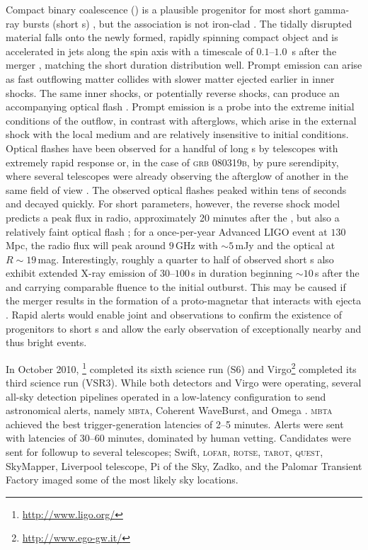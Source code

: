 Compact binary coalescence (\CBC{}) is a plausible progenitor for most short
gamma-ray bursts (short \GRB{}s) \citep{Lee:2005, nakar07}, but the
association is not iron-clad \citep{2011ApJ...727..109V}. The tidally
disrupted material falls onto the newly formed, rapidly spinning compact object
and is accelerated in jets along the spin axis with a timescale of
$0.1$--$1.0$~s after the merger \citep{Janka1999}, matching the short \GRB{}
duration distribution well. Prompt \EM{} emission can arise as fast outflowing
matter collides with slower matter ejected earlier in inner shocks. The same
inner shocks, or potentially reverse shocks, can produce an accompanying
optical flash \citep{Sari99}. Prompt emission is a probe into the extreme
initial conditions of the outflow, in contrast with afterglows, which arise in
the external shock with the local medium and are relatively insensitive to
initial conditions. Optical flashes have been observed for a handful of long
\GRB{}s \citep{2011CRPhy..12..255A} by telescopes with extremely rapid response
or, in the case of \textsc{grb 080319b}, by pure serendipity, where several
telescopes were already observing the afterglow of another \GRB{} in the same
field of view \citep{2008Natur.455..183R}. The observed optical flashes peaked
within tens of seconds and decayed quickly. For short \GRB{} parameters,
however, the reverse shock model predicts a peak flux in radio, approximately
20 minutes after the \GRB{}, but also a relatively faint optical flash
\citep{nakar07}; for a once-per-year Advanced LIGO event at $130$\,Mpc, the
radio flux will peak around $9$\,GHz with $\sim$$5$\,mJy and the optical at
$R\sim19$\,mag. Interestingly, roughly a quarter to half of observed short
\GRB{}s also exhibit extended X-ray emission of $30$--$100$\,s in duration
beginning $\sim$$10$\,s after the \GRB{} and carrying comparable fluence to the
initial outburst. This may be caused if the merger results in the formation of
a proto-magnetar that interacts with ejecta \citep{Bucciantini2011}. Rapid
\GW{} alerts would enable joint \EM{} and \GW{} observations to confirm the
existence of \CBC{} progenitors to short \GRB{}s and allow the early \EM{}
observation of exceptionally nearby and thus bright events.

In October 2010, \LIGO{}\footnote{\url{http://www.ligo.org/}} completed its
sixth science run (S6) and Virgo\footnote{\url{http://www.ego-gw.it/}}
completed its third science run (VSR3).  While both \LIGO{} detectors and Virgo
were operating, several all-sky detection pipelines operated in a low-latency
configuration to send astronomical alerts, namely \textsc{mbta}, Coherent
WaveBurst, and Omega \citep{HugheyGWPAW2011, S6lowlatency2, S6lowlatency3, S6lowlatency4}.
\textsc{mbta} achieved the best \GW{} trigger-generation latencies of 2--5 minutes.
Alerts were sent with latencies of 30--60 minutes, dominated by human vetting.
Candidates were sent for \EM{} followup to several telescopes; Swift,
\textsc{lofar}, \textsc{rotse}, \textsc{tarot}, \textsc{quest}, SkyMapper,
Liverpool telescope, Pi of the Sky, Zadko, and the Palomar Transient Factory
\citep{kanner2008, HugheyGWPAW2011} imaged some of the most likely sky
locations.

